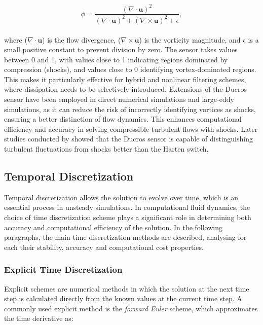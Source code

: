 \documentclass[a5paper]{sapthesis}
\begin{document}
	\begin{equation}
		\phi = \dfrac{(\nabla \cdot \mathbf{u})^2}{(\nabla \cdot \mathbf{u})^2 + (\nabla \times \mathbf{u})^2 + \epsilon},
	\end{equation}
	\\
	where ($\nabla \cdot \mathbf{u}$) is the flow divergence, ($\nabla \times \mathbf{u}$) is the vorticity magnitude, and $\epsilon$ is a small positive constant to prevent division by zero. The sensor takes values between 0 and 1, with values close to 1 indicating regions dominated by compression (shocks), and values close to 0 identifying vortex-dominated regions. This makes it particularly effective for hybrid and nonlinear filtering schemes, where dissipation needs to be selectively introduced. Extensions of the Ducros sensor have been employed in direct numerical simulations and large-eddy simulations, as it can reduce the risk of incorrectly identifying vortices as shocks, ensuring a better distinction of flow dynamics. This enhances computational efficiency and accuracy in solving compressible turbulent flows with shocks. 
	Later studies conducted by \citet{garnier2001class} showed that the Ducros sensor is capable of distinguishing turbulent
	ﬂuctuations from shocks better than the Harten \cite{HARTEN1983} switch.
	
	\subsection{Temporal Discretization}
	
	Temporal discretization allows the solution to evolve over time, which is an essential process in unsteady simulations. In computational fluid dynamics, the choice of time discretization scheme plays a significant role in determining both accuracy and computational efficiency of the solution. In the following paragraphs, the main time discretization methods are described, analysing for each their stability, accuracy and computational cost properties.
	
	\subsubsection{Explicit Time Discretization}
	
	Explicit schemes are numerical methods in which the solution at the next time step is calculated directly from the known values at the current time step. A commonly used explicit method is the \textit{forward Euler}\cite{darwish2016finite} scheme, which approximates the time derivative as:
	
\end{document}
